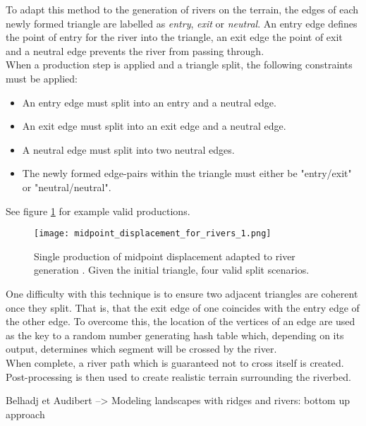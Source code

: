 To adapt this method to the generation of rivers on the terrain, the edges of each newly formed triangle are labelled as \textit{entry}, \textit{exit} or \textit{neutral}. An entry edge defines the point of entry for the river into the triangle, an exit edge the point of exit and a neutral edge prevents the river from passing through.\\

When a production step is applied and a triangle split, the following constraints must be applied:
\begin{itemize}
\item An entry edge must split into an entry and a neutral edge.
\item An exit edge must split into an exit edge and a neutral edge.
\item A neutral edge must split into two neutral edges.
\item The newly formed edge-pairs within the triangle must either be "entry/exit" or "neutral/neutral".
\end{itemize}

See figure \ref{Single production of midpoint displacement adapted to river generation. Given the initial triangle, four valid split scenarios. } for example valid productions.

\begin{figure}[h]
  \centering
	\label{Single production of midpoint displacement adapted to river generation. Given the initial triangle, four valid split scenarios. }
	\texttt{[image: midpoint\_displacement\_for\_rivers\_1.png]}
	\caption{Single production of midpoint displacement adapted to river generation \cite{Prusinkiewicz1993}. Given the initial triangle, four valid split scenarios.}
\end{figure}

One difficulty with this technique is to ensure two adjacent triangles are coherent once they split. That is, that the exit edge of one coincides with the entry edge of the other edge. To overcome this, the location of the vertices of an edge are used as the key to a random number generating hash table which, depending on its output, determines which segment will be crossed by the river.\\
When complete, a river path which is guaranteed not to cross itself is created. Post-processing is then used to create realistic terrain surrounding the riverbed.

Belhadj et Audibert --> Modeling landscapes with ridges and rivers: bottom up approach


